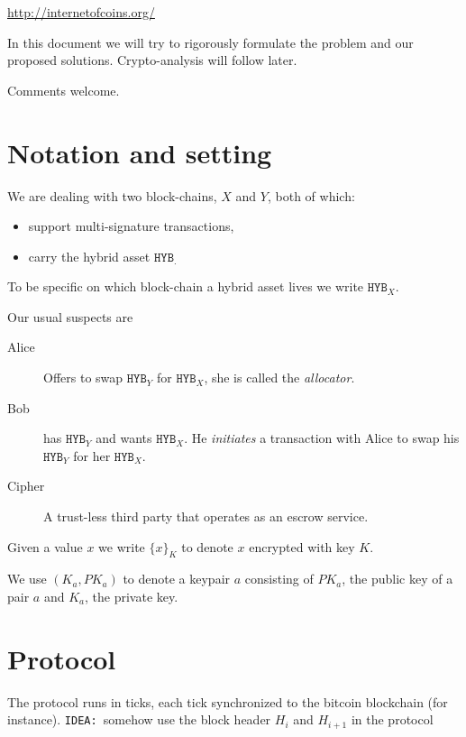 \documentclass[a4paper]{article}
\newcommand{\hyb}[1]{\ensuremath{\mathtt{ HYB }_{#1}}}
\newcommand{\IDEA}{{\color{blue}\texttt{IDEA: }}}
\newcommand{\crypt}[1]{\ensuremath{ {\lbrace {#1} \rbrace} } }
\begin{document}
\begin{center}
\url{http://internetofcoins.org/}
\end{center}

In this document we will try to rigorously formulate the problem and our proposed solutions. Crypto-analysis will follow later.

Comments welcome.

\section{Notation and setting}

We are dealing with two block-chains, $X$ and $Y$, both of which:

\begin{itemize}
\item support multi-signature transactions,
\item carry the hybrid asset \hyb.
\end{itemize}

To be specific on which block-chain a hybrid asset lives we write \hyb{X}.

Our usual suspects are

\begin{description}
	\item[Alice] Offers to swap \hyb{Y} for \hyb{X}, she is called the \emph{allocator}.
	
	\item[Bob] has \hyb{Y} and wants \hyb{X}. He \emph{initiates} a transaction with Alice to swap his \hyb{Y} for her \hyb{X}.
	
	\item[Cipher] A trust-less third party that operates as an escrow service.
\end{description}

Given a value $x$ we write $\crypt{x}_K$ to denote $x$ encrypted with key $K$.

We use $(K_a, PK_a)$ to denote a keypair $a$ consisting of
$PK_a$, the public key of a pair $a$ and $K_a$, the private key.

\section{Protocol}

The protocol runs in ticks, each tick synchronized to the bitcoin blockchain (for instance).
\IDEA somehow use the block header $H_i$ and $H_{i+1}$ in the protocol
\end{document}
